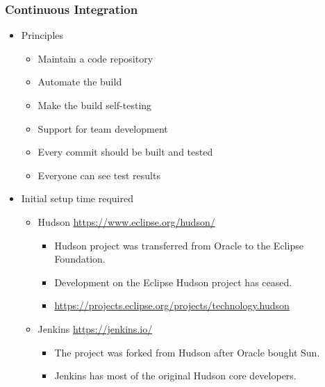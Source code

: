 \documentclass[10pt,xcolor=pdflatex]{beamer}
\begin{document}
\begin{frame}\frametitle{Continuous Integration}
\begin{itemize}
  \item Principles
   	\begin{itemize}
      \item Maintain a code repository
	  \item Automate the build
	  \item Make the build self-testing
	  \item Support for team development
	  \item Every commit should be built and tested
	  \item Everyone can see test results
   	\end{itemize}
  \item Initial setup time required
    \begin{itemize}
      \item Hudson \url{https://www.eclipse.org/hudson/}
      \begin{itemize}
          \item Hudson project was transferred from Oracle to the Eclipse Foundation.
          \item Development on the Eclipse Hudson project has ceased.
          \item[] \url{https://projects.eclipse.org/projects/technology.hudson}
      \end{itemize}
      \item Jenkins \url{https://jenkins.io/}
        \begin{itemize}
          \item The project was forked from Hudson after Oracle bought Sun.
          \item Jenkins has most of the original Hudson core developers.
        \end{itemize}
    \end{itemize}
\end{itemize}
\end{frame}
\end{document}
